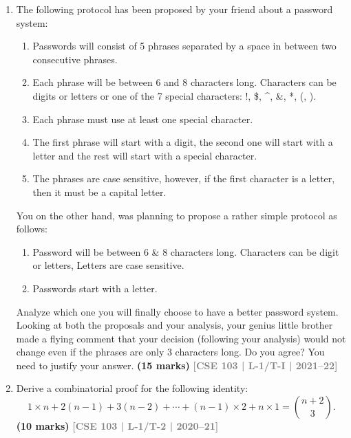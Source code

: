 \documentclass[12pt,a3paper]{article}
\newcommand{\yr}[1]{\hfill\textcolor{gray}{\small\textbf{[#1]}}}
\newcommand{\mk}[1]{\textcolor{orange!70!black}{\small\textbf{(#1 marks)}}}
\begin{document}
\begin{enumerate}
\item The following protocol has been proposed by your friend about a password system:
\begin{enumerate}
    \item Passwords will consist of 5 phrases separated by a space in between two consecutive phrases.
    \item Each phrase will be between 6 and 8 characters long. Characters can be digits or letters or one of the 7 special characters: !, \$, \^{}, \&, *, (, ).
    \item Each phrase must use at least one special character.
    \item The first phrase will start with a digit, the second one will start with a letter and the rest will start with a special character.
    \item The phrases are case sensitive, however, if the first character is a letter, then it must be a capital letter.
\end{enumerate}
You on the other hand, was planning to propose a rather simple protocol as follows:
\begin{enumerate}
    \item Password will be between 6 \& 8 characters long. Characters can be digit or letters, Letters are case sensitive.
    \item Passwords start with a letter.
\end{enumerate}
Analyze which one you will finally choose to have a better password system. Looking at both the proposals and your analysis, your genius little brother made a flying comment that your decision (following your analysis) would not change even if the phrases are only 3 characters long. Do you agree? You need to justify your answer.
\mk{15} \yr{CSE 103 | L-1/T-I | 2021--22}  

\item Derive a combinatorial proof for the following identity:
\[
  1 \times n + 2(n-1) + 3(n-2) + \cdots + (n-1) \times 2 + n \times 1 = \binom{n+2}{3}.
\]
\mk{10} \yr{CSE 103 | L-1/T-2 | 2020--21}


\end{enumerate}
\end{document}
